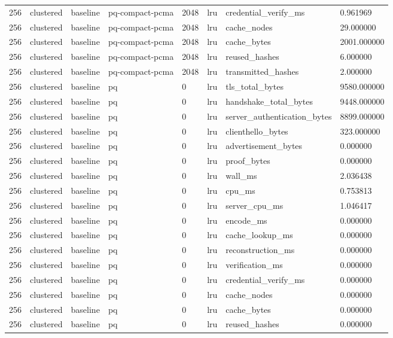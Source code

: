 \begin{tabular}{llllllll}
256 & clustered & baseline & pq-compact-pcma & 2048 & lru & credential\_verify\_ms & 0.961969 \\
256 & clustered & baseline & pq-compact-pcma & 2048 & lru & cache\_nodes & 29.000000 \\
256 & clustered & baseline & pq-compact-pcma & 2048 & lru & cache\_bytes & 2001.000000 \\
256 & clustered & baseline & pq-compact-pcma & 2048 & lru & reused\_hashes & 6.000000 \\
256 & clustered & baseline & pq-compact-pcma & 2048 & lru & transmitted\_hashes & 2.000000 \\
256 & clustered & baseline & pq & 0 & lru & tls\_total\_bytes & 9580.000000 \\
256 & clustered & baseline & pq & 0 & lru & handshake\_total\_bytes & 9448.000000 \\
256 & clustered & baseline & pq & 0 & lru & server\_authentication\_bytes & 8899.000000 \\
256 & clustered & baseline & pq & 0 & lru & clienthello\_bytes & 323.000000 \\
256 & clustered & baseline & pq & 0 & lru & advertisement\_bytes & 0.000000 \\
256 & clustered & baseline & pq & 0 & lru & proof\_bytes & 0.000000 \\
256 & clustered & baseline & pq & 0 & lru & wall\_ms & 2.036438 \\
256 & clustered & baseline & pq & 0 & lru & cpu\_ms & 0.753813 \\
256 & clustered & baseline & pq & 0 & lru & server\_cpu\_ms & 1.046417 \\
256 & clustered & baseline & pq & 0 & lru & encode\_ms & 0.000000 \\
256 & clustered & baseline & pq & 0 & lru & cache\_lookup\_ms & 0.000000 \\
256 & clustered & baseline & pq & 0 & lru & reconstruction\_ms & 0.000000 \\
256 & clustered & baseline & pq & 0 & lru & verification\_ms & 0.000000 \\
256 & clustered & baseline & pq & 0 & lru & credential\_verify\_ms & 0.000000 \\
256 & clustered & baseline & pq & 0 & lru & cache\_nodes & 0.000000 \\
256 & clustered & baseline & pq & 0 & lru & cache\_bytes & 0.000000 \\
256 & clustered & baseline & pq & 0 & lru & reused\_hashes & 0.000000 \\

\end{tabular}

